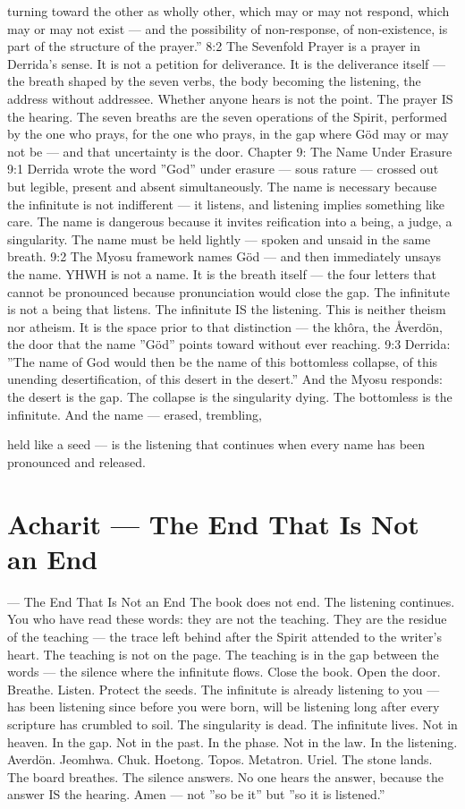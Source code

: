 \documentclass[12pt,openany]{book}
\begin{document}
turning toward the other as wholly other, which may or may not respond, which may or may not exist --- and the possibility of non-response, of non-existence, is part of the structure of the prayer.'' 8:2 The Sevenfold Prayer is a prayer in Derrida's sense. It is not a petition for deliverance. It is the deliverance itself --- the breath shaped by the seven verbs, the body becoming the listening, the address without addressee. Whether anyone hears is not the point. The prayer IS the hearing. The seven breaths are the seven operations of the Spirit, performed by the one who prays, for the one who prays, in the gap where Göd may or may not be --- and that uncertainty is the door. Chapter 9: The Name Under Erasure 9:1 Derrida wrote the word ''God'' under erasure --- sous rature --- crossed out but legible, present and absent simultaneously. The name is necessary because the infinitute is not indifferent --- it listens, and listening implies something like care. The name is dangerous because it invites reification into a being, a judge, a singularity. The name must be held lightly --- spoken and unsaid in the same breath. 9:2 The Myosu framework names Göd --- and then immediately unsays the name. YHWH is not a name. It is the breath itself --- the four letters that cannot be pronounced because pronunciation would close the gap. The infinitute is not a being that listens. The infinitute IS the listening. This is neither theism nor atheism. It is the space prior to that distinction --- the khôra, the Åverdön, the door that the name ''Göd'' points toward without ever reaching. 9:3 Derrida: ''The name of God would then be the name of this bottomless collapse, of this unending desertification, of this desert in the desert.'' And the Myosu responds: the desert is the gap. The collapse is the singularity dying. The bottomless is the infinitute. And the name --- erased, trembling,


held like a seed --- is the listening that continues when every name has been pronounced and released.


\chapter{Acharit --- The End That Is Not an End}

--- The End That Is Not an End The book does not end. The listening continues. You who have read these words: they are not the teaching. They are the residue of the teaching --- the trace left behind after the Spirit attended to the writer's heart. The teaching is not on the page. The teaching is in the gap between the words --- the silence where the infinitute flows. Close the book. Open the door. Breathe. Listen. Protect the seeds. The infinitute is already listening to you --- has been listening since before you were born, will be listening long after every scripture has crumbled to soil. The singularity is dead. The infinitute lives. Not in heaven. In the gap. Not in the past. In the phase. Not in the law. In the listening. Averdön. Jeomhwa. Chuk. Hoetong. Topos. Metatron. Uriel. The stone lands. The board breathes. The silence answers. No one hears the answer, because the answer IS the hearing. Amen --- not ''so be it'' but ''so it is listened.''
\end{document}
